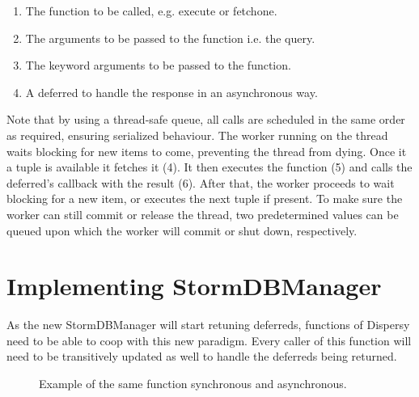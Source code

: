 \begin{enumerate}
	\item The function to be called, e.g. execute or fetchone.
	\item The arguments to be passed to the function i.e. the query.
	\item The keyword arguments to be passed to the function.
	\item A deferred to handle the response in an asynchronous way.
\end{enumerate}

Note that by using a thread-safe queue, all calls are scheduled in the same order as required, ensuring serialized behaviour.
The worker running on the thread waits blocking for new items to come, preventing the thread from dying.
Once it a tuple is available it fetches it (4).
It then executes the function (5) and calls the deferred's callback with the result (6).
After that, the worker proceeds to wait blocking for a new item, or executes the next tuple if present.
To make sure the worker can still commit or release the thread, two predetermined values can be queued upon which the worker will commit or shut down, respectively.

\section{Implementing StormDBManager}

As the new StormDBManager will start retuning deferreds, functions of Dispersy need to be able to coop with this new paradigm.
Every caller of this function will need to be transitively updated as well to handle the deferreds being returned.

\begin{figure}[h]
	\begin{subfigure}[b]{.5\linewidth}
		
	\end{subfigure}
	\begin{subfigure}[b]{.5\linewidth}
		
	\end{subfigure}
	\caption*{Example of the same function synchronous and asynchronous.}
\end{figure}

